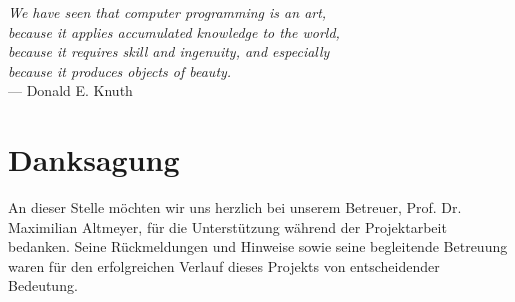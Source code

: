 
\begin{flushright}{\slshape    
    We have seen that computer programming is an art, \\ 
    because it applies accumulated knowledge to the world, \\ 
    because it requires skill and ingenuity, and especially \\
    because it produces objects of beauty.} \\ \medskip
    --- Donald E. Knuth \cite{knuth:1974}
\end{flushright}

\bigskip

\begingroup
	\let\clearpage\relax
	\let\cleardoublepage\relax
	\let\cleardoublepage\relax
	\chapter*{Danksagung}
	An dieser Stelle möchten wir uns herzlich bei unserem Betreuer, 
    Prof. Dr. Maximilian Altmeyer, für die Unterstützung während der 
    Projektarbeit bedanken. Seine Rückmeldungen und Hinweise sowie 
    seine begleitende Betreuung waren für den erfolgreichen Verlauf 
    dieses Projekts von entscheidender Bedeutung.

\endgroup


